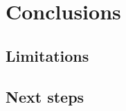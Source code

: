 \chapter{Conclusions}
\lipsum[1]

\section{Limitations}
\lipsum[1]

\section{Next steps}
\lipsum[1]
